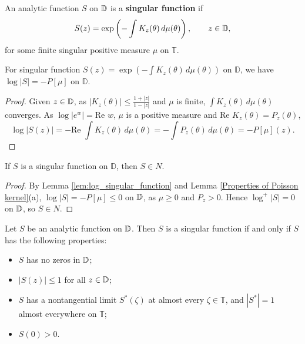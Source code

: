 \begin{definition}
An analytic function $S$ on $\mathbb{D}$ is a \textbf{singular function} if
\begin{equation*}
  S(z)=\exp\left(-\int K_z(\theta)\,d\mu(\theta)\right),
  \qquad z\in\mathbb{D},
\end{equation*}
for some finite singular positive measure $\mu$ on $\mathbb{T}$.
\end{definition}

\begin{lemma}\label{lem:log_singular_function}
For singular function $S(z)=\exp\left(-\int K_z(\theta)\,d\mu(\theta)\right)$
 on $\mathbb{D}$, we have $\log|S|=-P[\mu]$ on $\mathbb{D}$.
\end{lemma}
\begin{proof}
Given $z\in\mathbb{D}$, as $|K_z(\theta)|\leq\frac{1+|z|}{1-|z|}$ and $\mu$ is finite, 
$\int K_z(\theta)\,d\mu(\theta)$ converges. As $\log|e^w|=\text{Re } w$, $\mu$ is a positive
measure and $\text{Re } K_z(\theta)=P_z(\theta)$,
\begin{equation*}
  \log|S(z)|=-\text{Re }\int K_z(\theta)\,d\mu(\theta)
  =-\int P_z(\theta)\,d\mu(\theta)=-P[\mu](z).
\end{equation*}
\end{proof}

\begin{lemma}\label{lem:singular_function_in_N}
If $S$ is a singular function on $\mathbb{D}$, then $S\in N$.
\end{lemma}
\begin{proof}
By Lemma \ref{lem:log_singular_function} and Lemma \ref{Properties of Poisson kernel}(a),
$\log|S|=-P[\mu]\leq 0$ on $\mathbb{D}$, as $\mu\geq 0$ and $P_z>0$. Hence $\log^+|S|=0$ on $\mathbb{D}$,
so $S\in N$.
\end{proof}

\begin{theorem}\label{equivalent characterization of singular function}
Let $S$ be an analytic function on $\mathbb{D}$. Then $S$ is a singular function if and only if $S$ has the
following properties:
\begin{itemize}
  \item[(a)] $S$ has no zeros in $\mathbb{D}$;
  \item[(b)] $|S(z)|\leq 1$ for all $z\in\mathbb{D}$;
  \item[(c)] $S$ has a nontangential limit $S^*(\zeta)$ at almost every $\zeta\in\mathbb{T}$, and
  $|S^*|=1$ almost everywhere on $\mathbb{T}$;
  \item[(d)] $S(0)>0$.
\end{itemize}
\end{theorem}

